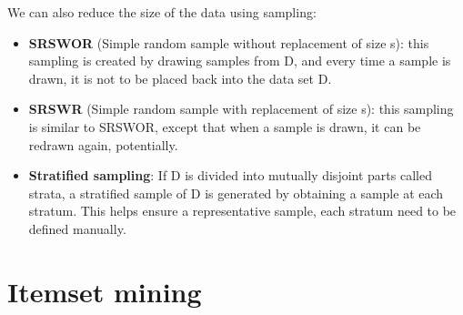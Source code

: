 \documentclass[12pt, openany]{report}
\theoremstyle{definition}
\begin{document}
We can also reduce the size of the data using sampling:
\begin{itemize}
    \item \textbf{SRSWOR} (Simple random sample without replacement of size s): this sampling is created by drawing samples from D, and every time a sample is drawn, it is not to be placed back into the data set D.
    \item \textbf{SRSWR} (Simple random sample with replacement of size s): this sampling is similar to SRSWOR, except that when a sample is drawn, it can be redrawn again, potentially.
    \item \textbf{Stratified sampling}: If D is divided into mutually disjoint parts called strata, a stratified sample of D is generated by obtaining a sample at each stratum. This helps ensure a representative sample, each stratum need to be defined manually.
\end{itemize} 
\chapter{Itemset mining}
\end{document}

